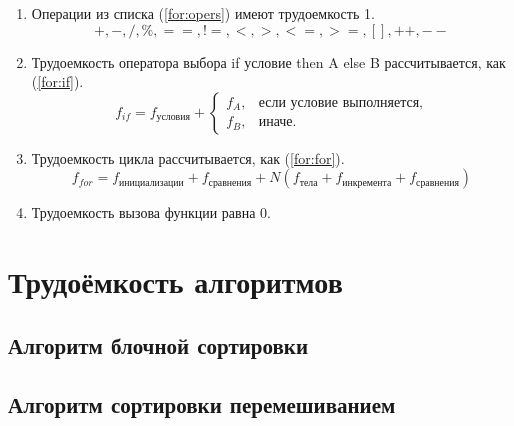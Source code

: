 \begin{enumerate}
	\item Операции из списка (\ref{for:opers}) имеют трудоемкость 1.
	\begin{equation}
	\label{for:opers}
	+, -, /, \%, ==, !=, <, >, <=, >=, [], ++, {-}-
	\end{equation}
	\item Трудоемкость оператора выбора if условие then A else B рассчитывается, как (\ref{for:if}).
	\begin{equation}
	\label{for:if}
	f_{if} = f_{\text{условия}} +
	\begin{cases}
	f_A, & \text{если условие выполняется,}\\
	f_B, & \text{иначе.}
	\end{cases}
	\end{equation}
	\item Трудоемкость цикла рассчитывается, как (\ref{for:for}).
	\begin{equation}
	\label{for:for}
	f_{for} = f_{\text{инициализации}} + f_{\text{сравнения}} + N(f_{\text{тела}} + f_{\text{инкремента}} + f_{\text{сравнения}})
	\end{equation}
	\item Трудоемкость вызова функции равна 0.
\end{enumerate}

\section{Трудоёмкость алгоритмов}

\subsection{Алгоритм блочной сортировки}

\subsection{Алгоритм сортировки перемешиванием}

